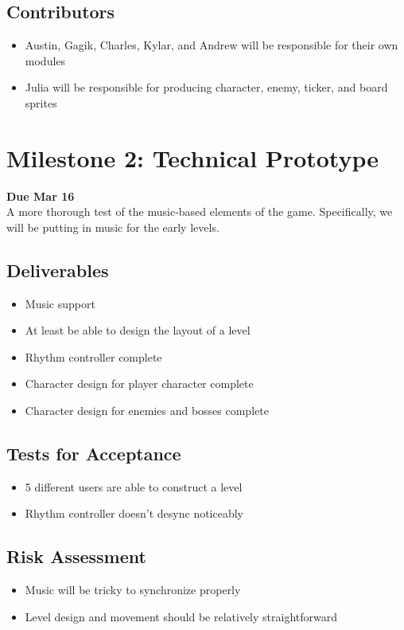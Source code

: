 \documentclass[]{article}
\begin{document}
\subsection*{Contributors}
\begin{itemize}
  \item Austin, Gagik, Charles, Kylar, and Andrew will be responsible 
    for their own modules
  \item Julia will be responsible for producing character, enemy, ticker, 
    and board sprites
\end{itemize}

\pagebreak
\section*{Milestone 2: Technical Prototype}
\noindent\textbf{Due Mar 16}\\
A more thorough test of the music-based elements of the game. 
Specifically, we will be putting in music for the early levels.
\subsection*{Deliverables}
\begin{itemize}
\item Music support
\item At least be able to design the layout of a level
\item Rhythm controller complete
\item Character design for player character complete
\item Character design for enemies and bosses complete
\end{itemize}
\subsection*{Tests for Acceptance}
\begin{itemize}
\item 5 different users are able to construct a level
\item Rhythm controller doesn’t desync noticeably
\end{itemize}
\subsection*{Risk Assessment}
\begin{itemize}
\item Music will be tricky to synchronize properly
\item Level design and movement should be relatively straightforward
\end{itemize}
\end{document}
